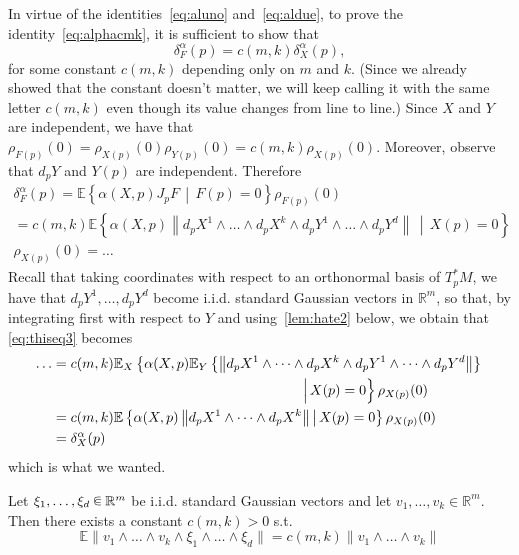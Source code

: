 \documentclass[AHL, Unicode, longabstracts, published]{cedram}
\newcommand{\R}{\mathbb{R}}
\newcommand{\EE}{\mathbb{E}}
\renewcommand{\a}{\alpha}
\newcommand*\randin{
\mathchoice {\raisebox{-.35ex}{$\displaystyle{^\subset}$}\mkern-11.5mu\raisebox{+.45ex}{$\displaystyle{_\subset}$}} {\mkern+1mu\raisebox{-.27ex}{$\textstyle{^\subset}$}\mkern-11.7mu\raisebox{+.45ex}{$\textstyle{_\subset}$}} {\raisebox{.35ex}{$\scriptstyle\subset$}\mkern-14mu\raisebox{-.15ex}{$\scriptstyle\subset$}} {\raisebox{.3ex}{$\scriptscriptstyle\subset$}\mkern-13.5mu\raisebox{-.10ex}{$\scriptscriptstyle\subset$}}}
\begin{document}
In virtue of the identities~\eqref{eq:aluno} and~\eqref{eq:aldue}, to prove the identity~\eqref{eq:alphacmk}, it is sufficient to show that
\begin{equation*}
\delta^\a_F(p)=c(m,k)\delta^\a_X(p),
\end{equation*}
for some constant $c(m,k)$ depending only on $m$ and $k$. (Since we already showed that the constant doesn't matter, we will keep calling it with the same letter $c(m,k)$ even though its value changes from line to line.) Since $X$ and $Y$ are independent, we have that $\rho_{F(p)}(0)=\rho_{X(p)}(0)\rho_{Y(p)}(0)=c(m,k)\rho_{X(p)}(0)$. Moreover, observe that $d_pY$ and $Y(p)$ are independent. Therefore
\begin{multline}\label{eq:thiseq3}
\delta^\a_F(p)
 =\EE\left\{\a(X,p)J_pF\,\middle|\,F(p)=0\right\}\rho_{F(p)}(0)
\\
= c(m,k)\EE\left\{\a(X,p)\left\|d_pX^1\wedge \dots \wedge d_pX^k\wedge d_pY^1\wedge \dots \wedge d_pY^d \right\|\,\middle|\, X(p)=0\right\}
\\
\rho_{X(p)}(0)=\dots
\end{multline}
Recall that taking coordinates with respect to an orthonormal basis of $T^*_pM$, we have that $d_pY^1,\dots,d_pY^d$ become i.i.d. standard Gaussian vectors in $\R^m$, so that, by integrating first with respect to $Y$ and using~\cref{lem:hate2} below, we obtain that \eqref{eq:thiseq3} becomes
\begin{align*}
\dots
&=c(m,k)\EE_{X}\left\{\a(X,p)\EE_Y\left\{\left\|d_pX^1\wedge \dots \wedge d_pX^k\wedge d_pY^1\wedge \dots \wedge d_pY^d\right\|\right\}\right.\\
&\mkern318mu\left.\Big|\, X(p)=0\right\}\rho_{X(p)}(0)
\\
&= c(m,k)\EE\left\{\a(X,p)\left\|d_pX^1\wedge \dots \wedge d_pX^k\right\|\,\middle|\, X(p)=0\right\}\rho_{X(p)}(0)\\ 
&=\delta^\a_X(p)
\end{align*}
which is what we wanted.

\begin{lemm}\label{lem:hate2}
Let $\xi_1,\dots,\xi_d\,\randin\, \R^m$ be i.i.d. standard Gaussian vectors and let $v_1,\dots,v_k\in\R^m$. Then there exists a constant $c(m,k)>0$ s.t.
\begin{equation*}
\EE\|v_1\wedge \dots \wedge v_k\wedge \xi_1\wedge \dots \wedge \xi_d\|=c(m,k)\|v_1\wedge \dots \wedge v_k\|
\end{equation*}
\end{lemm}
\end{document}
